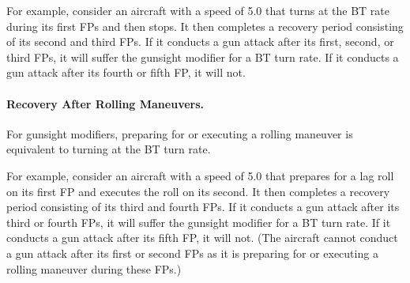 {For example, consider an aircraft with a speed of 5.0 that turns at the BT rate during its first FPs and then stops. It then completes a recovery period consisting of its second and third FPs. If it conducts a gun attack after its first, second, or third FPs, it will suffer the gunsight modifier for a BT turn rate. If it conducts a gun attack after its fourth or fifth FP, it will not.

\paragraph{Recovery After Rolling Maneuvers.} For gunsight modifiers, preparing for or executing a rolling maneuver is equivalent to turning at the BT turn rate.

For example, consider an aircraft with a speed of 5.0 that prepares for a lag roll on its first FP and executes the roll on its second. It then completes a recovery period consisting of its third and fourth FPs. If it conducts a gun attack after its third or fourth FPs, it will suffer the gunsight modifier for a BT turn rate. If it conducts a gun attack after its fifth FP, it will not. (The aircraft cannot conduct a gun attack after its first or second FPs as it is preparing for or executing a rolling maneuver during these FPs.)


}

